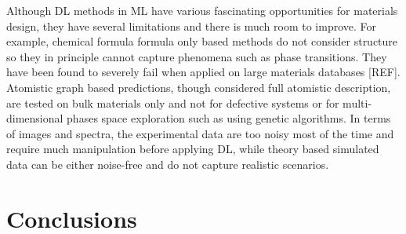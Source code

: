 \documentclass[pdflatex,sn-mathphys]{sn-jnl}%
\theoremstyle{thmstyleone}%
\theoremstyle{thmstyletwo}%
\theoremstyle{thmstylethree}%
\begin{document}
Although DL methods in ML have various fascinating opportunities for materials design, they have several limitations and there is much room to improve. For example, chemical formula formula only based methods do not consider structure so they in principle cannot capture phenomena such as phase transitions. They have been found to severely fail when applied on large materials databases [REF]. Atomistic graph based predictions, though considered full atomistic description, are tested on bulk materials only and not for defective systems or for multi-dimensional phases space exploration such as using genetic algorithms. In terms of images and spectra, the experimental data are too noisy most of the time and require much manipulation before applying DL, while theory based simulated data can be either noise-free and do not capture realistic scenarios.

\section{Conclusions}\label{sec:conclusion}




\end{document}
